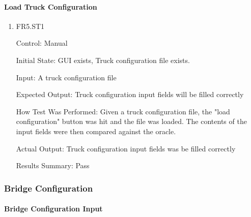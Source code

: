 \documentclass[12pt, titlepage]{article}
\begin{document}
\paragraph{Load Truck Configuration}

\begin{enumerate}

  \item{FR5.ST1\\}

  Control: Manual

  Initial State: GUI exists, Truck configuration file exists.

  Input: A truck configuration file

  Expected Output: Truck configuration input fields will be filled correctly

  How Test Was Performed: Given a truck configuration file, the "load configuration" button was hit and the file was loaded. The contents of the input fields were then compared against the oracle.

  Actual Output: Truck configuration input fields was be filled correctly

  Results Summary: Pass

\end{enumerate}

\subsubsection{Bridge Configuration}

\paragraph{Bridge Configuration Input}
\end{document}
